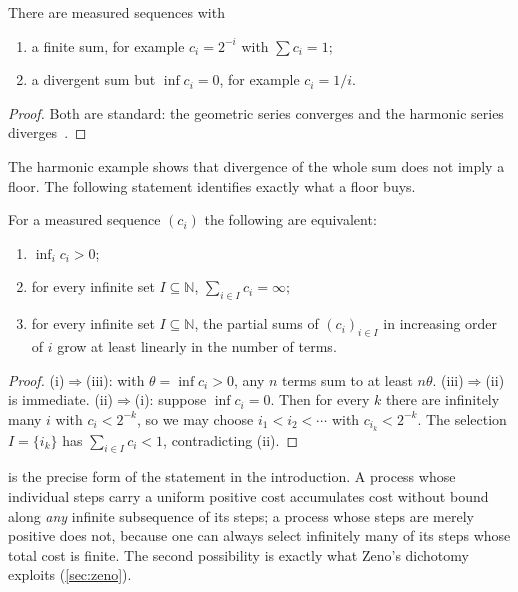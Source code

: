 \documentclass[10pt,twocolumn,a4paper]{article}
\newcommand{\N}{\mathbb{N}}
\begin{document}
\begin{proposition}
\label{prop:positivity}
There are measured sequences with
\begin{enumerate}[label=(\alph*),nosep]
\item a finite sum, for example $c_i=2^{-i}$ with $\sum c_i=1$;
\item a divergent sum but $\inf c_i=0$, for example $c_i=1/i$.
\end{enumerate}
\end{proposition}

\begin{proof}
Both are standard: the geometric series converges and the harmonic series
diverges~\citep{knopp1990}.
\end{proof}

The harmonic example shows that divergence of the whole sum does not imply a
floor. The following statement identifies exactly what a floor buys.

\begin{theorem}
\label{thm:selection}
For a measured sequence $(c_i)$ the following are equivalent:
\begin{enumerate}[label=(\roman*),nosep]
\item $\inf_i c_i>0$;
\item for every infinite set $I\subseteq\N$, $\sum_{i\in I}c_i=\infty$;
\item for every infinite set $I\subseteq\N$, the partial sums of
      $(c_i)_{i\in I}$ in increasing order of $i$ grow at least linearly in
      the number of terms.
\end{enumerate}
\end{theorem}

\begin{proof}
(i)$\Rightarrow$(iii): with $\theta=\inf c_i>0$, any $n$ terms sum to at least
$n\theta$. (iii)$\Rightarrow$(ii) is immediate. (ii)$\Rightarrow$(i): suppose
$\inf c_i=0$. Then for every $k$ there are infinitely many $i$ with
$c_i<2^{-k}$, so we may choose $i_1<i_2<\cdots$ with $c_{i_k}<2^{-k}$. The
selection $I=\{i_k\}$ has $\sum_{i\in I}c_i<1$, contradicting (ii).
\end{proof}

 is the precise form of the statement in the
introduction. A process whose individual steps carry a uniform positive cost
accumulates cost without bound along \emph{any} infinite subsequence of its
steps; a process whose steps are merely positive does not, because one can
always select infinitely many of its steps whose total cost is finite. The
second possibility is exactly what Zeno's dichotomy exploits
(\cref{sec:zeno}).
\end{document}
